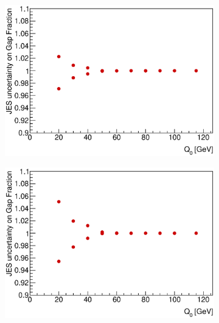 \begin{figure}
\centering
        \begin{subfigure}[b]{0.5\textwidth}
                \centering
                \includegraphics[width=\textwidth]{figures/GBJ2/JES/Smeared2_3__Q0.eps}
        \end{subfigure}%
        \begin{subfigure}[b]{0.5\textwidth}
                \centering
                \includegraphics[width=\textwidth]{figures/GBJ2/JES/Smeared4_5__Q0.eps}
        \end{subfigure}%


\end{figure}
